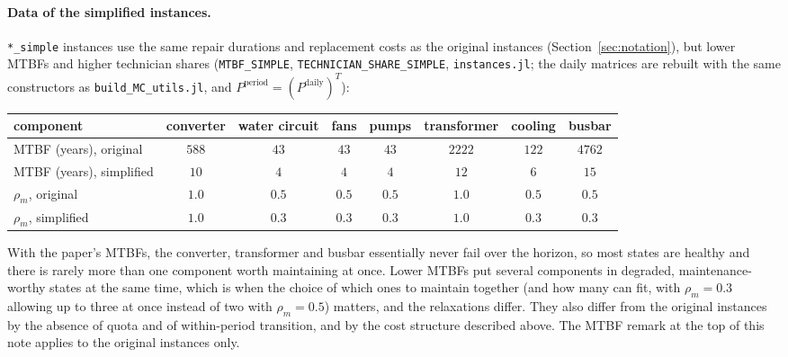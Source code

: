 \documentclass[11pt]{article}
\begin{document}
\paragraph{Data of the simplified instances.} \texttt{*\_simple} instances use the same
repair durations and replacement costs as the original instances (Section~\ref{sec:notation}),
but lower MTBFs and higher technician shares (\texttt{MTBF\_SIMPLE},
\texttt{TECHNICIAN\_SHARE\_SIMPLE}, \texttt{instances.jl}; the daily matrices are rebuilt with
the same constructors as \texttt{build\_MC\_utils.jl}, and $P^{\mathrm{period}} =
(P^{\mathrm{daily}})^{T}$):
\begin{center}
\begin{tabular}{lccccccc}
\toprule
component & converter & water circuit & fans & pumps & transformer & cooling & busbar \\
\midrule
MTBF (years), original   & $588$ & $43$ & $43$ & $43$ & $2222$ & $122$ & $4762$ \\
MTBF (years), simplified & $10$  & $4$  & $4$  & $4$  & $12$   & $6$   & $15$   \\
$\rho_m$, original       & $1.0$ & $0.5$ & $0.5$ & $0.5$ & $1.0$ & $0.5$ & $0.5$ \\
$\rho_m$, simplified     & $1.0$ & $0.3$ & $0.3$ & $0.3$ & $1.0$ & $0.3$ & $0.3$ \\
\bottomrule
\end{tabular}
\end{center}
With the paper's MTBFs, the converter, transformer and busbar essentially never fail over the
horizon, so most states are healthy and there is rarely more than one component worth
maintaining at once. Lower MTBFs put several components in degraded, maintenance-worthy
states at the same time, which is when the choice of which ones to maintain together (and
how many can fit, with $\rho_m = 0.3$ allowing up to three at once instead of two with
$\rho_m = 0.5$) matters, and the relaxations differ. They also differ from the original
instances by the absence of quota and of within-period transition, and by the cost structure
described above. The MTBF remark at the top of this note applies to the original instances
only.
\end{document}
